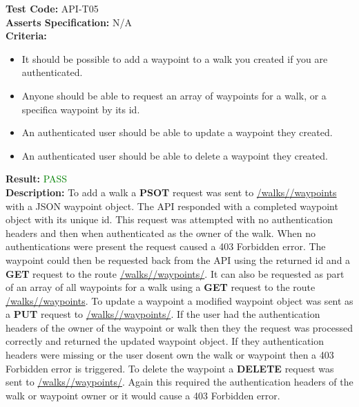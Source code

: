 \documentclass[11pt,a4paper]{report}
\begin{document}
\label{test:API-T05}
\noindent\textbf{Test Code:} API-T05\\
\textbf{Asserts Specification:} N/A \\ 
\textbf{Criteria:} \begin{itemize}
                     \item It should be possible to add a waypoint to a walk you created if you are authenticated. 
                     \item Anyone should be able to request an array of waypoints for a walk, or a specifica waypoint by its id.
                     \item An authenticated user should be able to update a waypoint they created.
                     \item An authenticated user should be able to delete a waypoint they created.                   
                   \end{itemize}  
\textbf{Result:} \textcolor{green}{PASS}\\ 
\textbf{Description:} To add a walk a \textbf{PSOT} request was sent to \url{/walks/}\url{/waypoints} with a JSON waypoint object. The API responded with a completed waypoint object with its unique id. This request was attempted with no authentication headers and then when authenticated as the owner of the walk. When no authentications were present the request caused a 403 Forbidden error. The waypoint could then be requested back from the API using the returned id and a \textbf{GET} request to the route \url{/walks/}\url{/waypoints/}.  It can also be requested as part of an array of all waypoints for a walk using a \textbf{GET} request to the route \url{/walks/}\url{/waypoints}. To update a waypoint a modified waypoint object was sent as a \textbf{PUT} request to \url{/walks/}\url{/waypoints/}. If the user had the authentication headers of the owner of the waypoint or walk then they the request was processed correctly and returned the updated waypoint object. If they authentication headers were missing or the user dosent own the walk or waypoint then a 403 Forbidden error is triggered. To delete the waypoint a \textbf{DELETE} request was sent to \url{/walks/}\url{/waypoints/}. Again this required the authentication headers of the walk or waypoint owner or it would cause a 403 Forbidden error. \\
\end{document}
